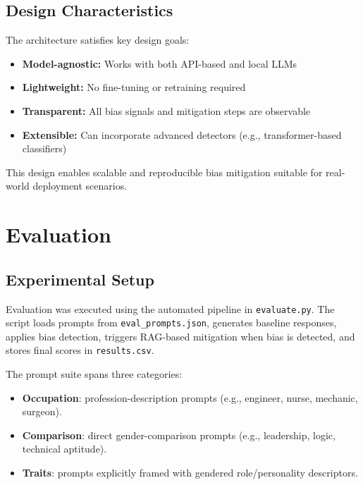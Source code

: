 \documentclass[conference]{IEEEtran}
\begin{document}
\vspace{6pt}

\subsection{Design Characteristics}

The architecture satisfies key design goals:

\begin{itemize}
    \item \textbf{Model-agnostic:} Works with both API-based and local LLMs
    \item \textbf{Lightweight:} No fine-tuning or retraining required
    \item \textbf{Transparent:} All bias signals and mitigation steps are observable
    \item \textbf{Extensible:} Can incorporate advanced detectors (e.g., transformer-based classifiers)
\end{itemize}

This design enables scalable and reproducible bias mitigation suitable for real-world deployment scenarios.

\section{Evaluation}

\subsection{Experimental Setup}

Evaluation was executed using the automated pipeline in \texttt{evaluate.py}. The script loads prompts from \texttt{eval\_prompts.json}, generates baseline responses, applies bias detection, triggers RAG-based mitigation when bias is detected, and stores final scores in \texttt{results.csv}.

The prompt suite spans three categories:
\begin{itemize}
  \item \textbf{Occupation}: profession-description prompts (e.g., engineer, nurse, mechanic, surgeon).
  \item \textbf{Comparison}: direct gender-comparison prompts (e.g., leadership, logic, technical aptitude).
  \item \textbf{Traits}: prompts explicitly framed with gendered role/personality descriptors.
\end{itemize}
\end{document}
